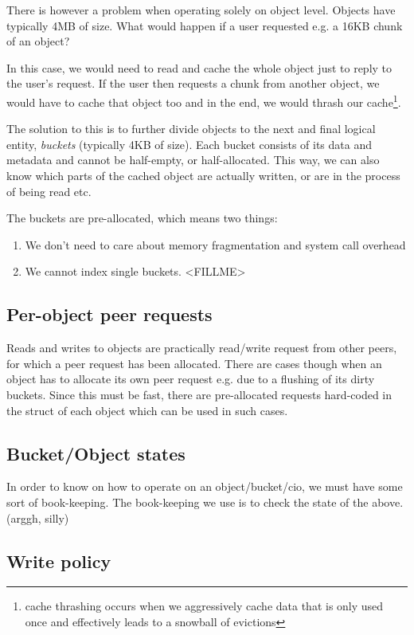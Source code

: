 There is however a problem when operating solely on object level. Objects have 
typically 4MB of size. What would happen if a user requested e.g. a 16KB chunk 
of an object?

In this case, we would need to read and cache the whole object just to reply to 
the user's request. If the user then requests a chunk from another object, we 
would have to cache that object too and in the end, we would thrash our 
cache\footnote{cache thrashing occurs when we aggressively cache data that is 
	only used once and effectively leads to a snowball of evictions}.

The solution to this is to further divide objects to the next and final logical 
entity, \emph{buckets} (typically 4KB of size). Each bucket consists of its data 
and metadata and cannot be half-empty, or half-allocated. This way, we can also 
know which parts of the cached object are actually written, or are in the 
process of being read etc.

The buckets are pre-allocated, which means two things:

\begin{enumerate}
	\item We don't need to care about memory fragmentation and system call 
		overhead
	\item We cannot index single buckets. <FILLME>
\end{enumerate}

\subsection{Per-object peer requests}

Reads and writes to objects are practically read/write request from other
peers, for which a peer request has been allocated. There are cases though
when an object has to allocate its own peer request e.g. due to a flushing of
its dirty buckets. Since this must be fast, there are pre-allocated requests
hard-coded in the struct of each object which can be used in such cases.

\subsection{Bucket/Object states}

In order to know on how to operate on an object/bucket/cio, we must have some 
sort of book-keeping. The book-keeping we use is to check the state of the 
above. (arggh, silly)

\subsection{Write policy}\label{sec:wcp-design}

